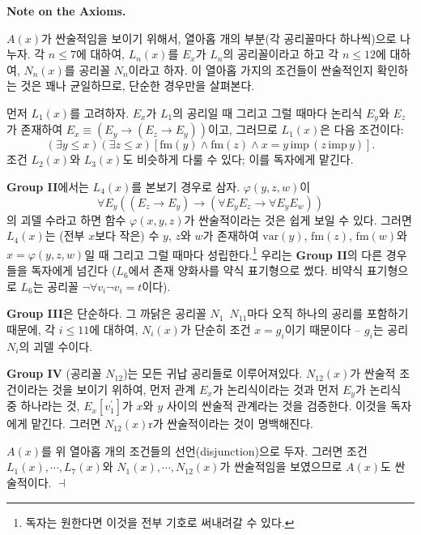 \documentclass[12pt]{paper}
\newenvironment{context}[1][]
{ \noindent \textbf{{#1}.}
}
{ \hfill $ \dashv $ }
\begin{document}
\begin{context}[Note on the Axioms]
$ A \left( x \right) $가 싼술적임을 보이기 위해서, 열아홉 개의 부분(각 공리꼴마다 하나씩)으로 나누자.
각 $ n \le 7 $에 대하여, $ L_{n} \left( x \right) $를 $E_{x}$가 $L_{n}$의 공리꼴이라고 하고
각 $n \le 12$에 대하여, $N_{n} \left( x \right) $를 공리꼴 $N_{n}$이라고 하자.
이 열아홉 가지의 조건들이 싼술적인지 확인하는 것은 꽤나 균일하므로, 단순한 경우만을 살펴본다.

먼저 $L_{1} \left( x \right)$를 고려하자. 
$E_{x}$가 $L_{1}$의 공리일 때 그리고 그럴 때마다 논리식 $E_{y}$와 $E_{z}$가 존재하여
$E_{x} \equiv \left( E_y \rightarrow \left( E_z \rightarrow E_y \right) \right)$이고,
그러므로 $L_1\left( x \right)$은 다음 조건이다:
$$ \left( \exists y \le x \right) \left( \exists z \le x \right) \left[ \mathrm{fm} \left( y \right) \land \mathrm{fm} \left( z \right) \land x = y \, \mathrm{imp} \, \left( z \, \mathrm{imp} \, y \right) \right] .$$
조건 $L_2\left( x \right)$와 $L_{3}\left( x \right)$도 비슷하게 다룰 수 있다; 이를 독자에게 맡긴다.

\textbf{Group II}에서는 $L_4 \left( x \right)$를 본보기 경우로 삼자.
$\varphi \left( y , z ,w \right)$이 $$\forall E_y \left(\left(E_z \rightarrow E_y\right) \rightarrow \left(\forall E_y E_z \rightarrow \forall E_y E_w \right)\right)$$의 괴델 수라고 하면
함수 $\varphi \left( x , y, z \right)$가 싼술적이라는 것은 쉽게 보일 수 있다.
그러면 $L_4 \left( x \right)$는 (전부 $x$보다 작은) 수 $y$, $z$와 $w$가 존재하여
$\mathrm{var} \left( y \right)$, $\mathrm{fm} \left( z \right)$, $\mathrm{fm} \left( w \right)$와 $x = \varphi \left( y , z , w \right)$일 때 그리고 그럴 때마다 성립한다.\footnote
{
독자는 원한다면 이것을 전부 기호로 써내려갈 수 있다.
}
우리는 \textbf{Group II}의 다른 경우들을 독자에게 넘긴다
($L_6$에서 존재 양화사를 약식 표기형으로 썼다. 비약식 표기형으로 $L_6$는 공리꼴 $\lnot \forall v_i \lnot v_i = t$이다).

\textbf{Group III}은 단순하다. 그 까닭은 공리꼴 $N_{1}$~$N_{11}$마다 오직 하나의 공리를 포함하기 때문에,
각 $i \le 11$에 대하여, $N_i \left( x \right)$가 단순히 조건 $x = g_i$이기 때문이다 -- $g_i$는 공리 $N_i$의 괴델 수이다.

\textbf{Group IV} (공리꼴 $N_{12}$)는 모든 귀납 공리들로 이루어져있다.
$N_{12} \left( x \right)$가 싼술적 조건이라는 것을 보이기 위하여, 먼저 관계 $E_x$가 논리식이라는 것과
먼저 $E_y$가 논리식 중 하나라는 것, $E_x \left[ v_1^{\prime} \right]$가 $x$와 $y$ 사이의 싼술적 관계라는 것을 검증한다.
이것을 독자에게 맡긴다. 그러면 $N_{12} \left( x \right)$r가 싼술적이라는 것이 명백해진다.

$A \left( x \right)$를 위 열아홉 개의 조건들의 선언(disjunction)으로 두자.
그러면 조건 $L_1 \left( x \right) , \cdots , L_7 \left( x \right)$와
$N_1 \left( x \right) , \cdots , N_{12} \left( x \right)$가 싼술적임을 보였으므로
$A \left( x \right)$도 싼술적이다.
\end{context}
\end{document}
